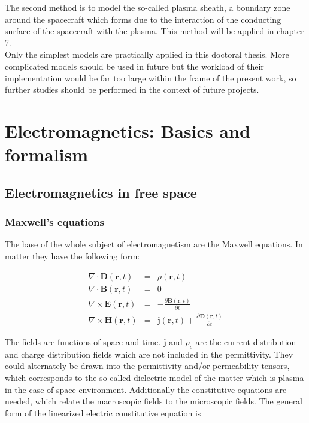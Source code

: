 \documentclass[a4paper,11pt]{thesis}
\begin{document}
The second method is to model the so-called plasma sheath, a boundary zone around the spacecraft which forms due to the interaction of the conducting surface of the spacecraft with the plasma. This method will be applied in chapter 7.\\

Only the simplest models are practically applied in this doctoral thesis. More complicated models should be used in future but the workload of their implementation would be far too large within the frame of the present work, so further studies should be performed in the context of future projects.


\chapter{Electromagnetics: Basics and formalism}
\section{Electromagnetics in free space}
\subsection{Maxwell's equations}
The base of the whole subject of electromagnetism are the Maxwell
equations. In matter they have the following form:

\begin{eqnarray}
\nabla \cdot \mathbf{D}(\mathbf{r},t)&=&\rho(\mathbf{r},t) \label{maxwell1}\\
\nabla \cdot \mathbf{B}(\mathbf{r},t)&=&0 \label{maxwell2} \\
\nabla \times \mathbf{E}(\mathbf{r},t)&=&-\frac{\partial \mathbf{B}(\mathbf{r},t)}{\partial t} \label{maxwell3} \\
\nabla \times \mathbf{H}(\mathbf{r},t)&=&\mathbf{j}(\mathbf{r},t)+ \frac{\partial \mathbf{D}(\mathbf{r},t)}{\partial t} \label{maxwell4}
\end{eqnarray}

The fields are functions of space and time. $\mathbf{j}$ and
$\rho_c$ are the current distribution and charge distribution fields
which are not included in the permittivity. They could alternately
be drawn into the permittivity and/or permeability tensors, which corresponds to the so called dielectric model of the matter which is plasma in the case of space environment.
Additionally the constitutive equations are needed, which relate the
macroscopic fields to the microscopic fields. The general form of the linearized electric constitutive equation is
\end{document}
